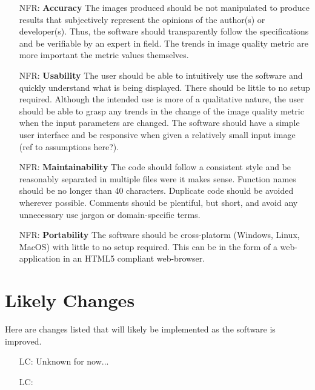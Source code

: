 \documentclass[12pt]{article}
\newcounter{nfrnum} %
\newcounter{lcnum} %
\begin{document}
\noindent \begin{itemize}

\item[NFR\refstepcounter{nfrnum}\thenfrnum \label{NFR_Accuracy}:]
  \textbf{Accuracy} The images produced should be not manipulated to produce 
  results that subjectively represent the opinions of the author(s) or 
  developer(s). Thus, the software should transparently follow the 
  specifications and be verifiable by an expert in field. The trends in image 
  quality metric are more important the metric values themselves.

\item[NFR\refstepcounter{nfrnum}\thenfrnum \label{NFR_Usability}:] \textbf{Usability} The user should be able to intuitively use the 
  software and quickly understand what is being displayed. There should be 
  little to no setup required. Although the intended 
  use is more of a qualitative nature, the user should be able to grasp any 
  trends in the change of the image quality metric when the input parameters are 
  changed. The software should have a simple user interface and be responsive 
  when given a relatively small input image (ref to assumptions here?).

\item[NFR\refstepcounter{nfrnum}\thenfrnum \label{NFR_Maintainability}:]
  \textbf{Maintainability} The code should follow a consistent style and
  be reasonably separated in multiple files were it makes sense. Function names 
  should be no longer than 40 characters. Duplicate code should be avoided 
  wherever possible. Comments should be plentiful, but short, and avoid any 
  unnecessary use jargon or domain-specific terms.

\item[NFR\refstepcounter{nfrnum}\thenfrnum \label{NFR_Portability}:]
  \textbf{Portability} The software should be cross-platorm (Windows, Linux, 
  MacOS) with little to no setup required. This can be in the form of a 
  web-application in an HTML5 compliant web-browser.

\end{itemize}

\section{Likely Changes}    
Here are changes listed that will likely be implemented as the software is improved.

\noindent \begin{itemize}

\item[LC\refstepcounter{lcnum}\thelcnum\label{LC_meaningfulLabel0}:] Unknown for now...

\item[LC\refstepcounter{lcnum}\thelcnum\label{LC_meaningfulLabel}:] 

\end{itemize}
\end{document}
